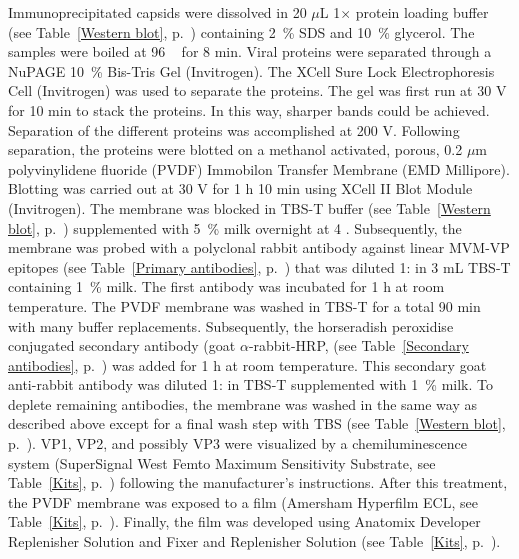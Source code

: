Immunoprecipitated capsids were dissolved in 20 $\mu$L 1$\times$ protein loading buffer (see Table~\ref{Western blot}, p.~\pageref{Western blot}) containing 2~\% SDS and 10~\% glycerol. The samples were boiled at 96 \textcelsius~ for 8 min. Viral proteins were separated through a NuPAGE\textsuperscript{\textregistered} 10~\% Bis-Tris Gel (Invitrogen). The XCell Sure Lock\textsuperscript{\texttrademark} Electrophoresis Cell (Invitrogen) was used to separate the proteins. The gel was first run at 30 V for 10 min to stack the proteins. In this way, sharper bands could be achieved. Separation of the different proteins was accomplished at 200 V. Following separation, the proteins were blotted on a methanol activated, porous, 0.2 $\mu$m polyvinylidene fluoride (PVDF) Immobilon\textsuperscript{\textregistered} Transfer Membrane (EMD Millipore). Blotting was carried out at 30 V for 1 h 10 min using XCell II\textsuperscript{\texttrademark} Blot Module (Invitrogen). 
The membrane was blocked in TBS-T buffer (see Table~\ref{Western blot}, p.~\pageref{Western blot}) supplemented with 5~\% milk overnight at 4 \textcelsius. Subsequently, the membrane was probed with a polyclonal rabbit antibody against linear MVM-VP epitopes (see Table~\ref{Primary antibodies}, p.~\pageref{Primary antibodies}) that was diluted 1: in 3 mL TBS-T containing 1~\% milk. The first antibody was incubated for 1 h at room temperature. The PVDF membrane was washed in TBS-T for a total 90 min with many buffer replacements. Subsequently, the horseradish peroxidise conjugated secondary antibody (goat $\alpha$-rabbit-HRP, (see Table~\ref{Secondary antibodies}, p.~\pageref{Secondary antibodies}) was added for 1 h at room temperature. This secondary goat anti-rabbit antibody was diluted 1: in TBS-T supplemented with 1~\% milk. To deplete remaining antibodies, the membrane was washed in the same way as described above except for a final wash step with TBS (see Table~\ref{Western blot}, p.~\pageref{Western blot}). VP1, VP2, and possibly VP3 were visualized by a chemiluminescence system (SuperSignal\textsuperscript{\textregistered} West Femto Maximum Sensitivity Substrate, see Table~\ref{Kits}, p.~\pageref{Kits}) following the manufacturer’s instructions. After this treatment, the PVDF membrane was exposed to a film (Amersham Hyperfilm\textsuperscript{\texttrademark} ECL, see Table~\ref{Kits}, p.~\pageref{Kits}). Finally, the film was developed using Anatomix Developer Replenisher Solution and Fixer and Replenisher Solution (see Table~\ref{Kits}, p.~\pageref{Kits}).

